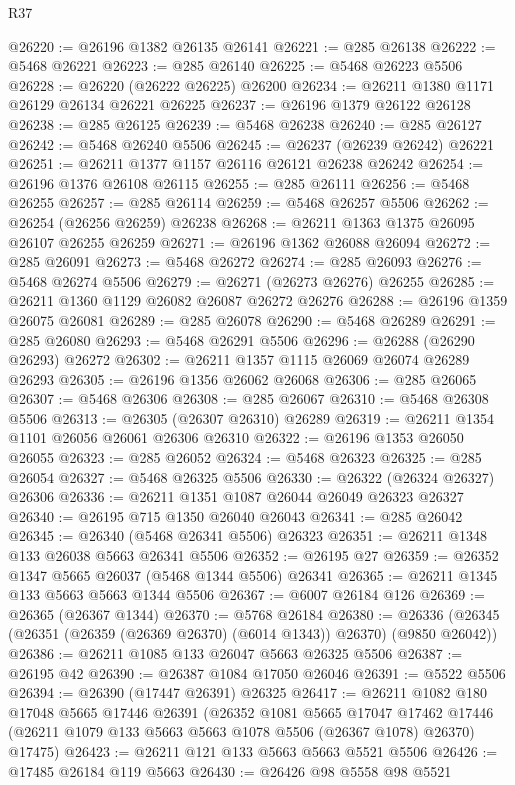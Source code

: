 \begin{lexlean}{R37}
\begin{coremodule}
@26220 := @26196 @1382 @26135 @26141
@26221 := @285 @26138
@26222 := @5468 @26221
@26223 := @285 @26140
@26225 := @5468 @26223 @5506
@26228 := @26220 (@26222 @26225) @26200
@26234 := @26211 @1380 @1171 @26129 @26134 @26221 @26225
@26237 := @26196 @1379 @26122 @26128
@26238 := @285 @26125
@26239 := @5468 @26238
@26240 := @285 @26127
@26242 := @5468 @26240 @5506
@26245 := @26237 (@26239 @26242) @26221
@26251 := @26211 @1377 @1157 @26116 @26121 @26238 @26242
@26254 := @26196 @1376 @26108 @26115
@26255 := @285 @26111
@26256 := @5468 @26255
@26257 := @285 @26114
@26259 := @5468 @26257 @5506
@26262 := @26254 (@26256 @26259) @26238
@26268 := @26211 @1363 @1375 @26095 @26107 @26255 @26259
@26271 := @26196 @1362 @26088 @26094
@26272 := @285 @26091
@26273 := @5468 @26272
@26274 := @285 @26093
@26276 := @5468 @26274 @5506
@26279 := @26271 (@26273 @26276) @26255
@26285 := @26211 @1360 @1129 @26082 @26087 @26272 @26276
@26288 := @26196 @1359 @26075 @26081
@26289 := @285 @26078
@26290 := @5468 @26289
@26291 := @285 @26080
@26293 := @5468 @26291 @5506
@26296 := @26288 (@26290 @26293) @26272
@26302 := @26211 @1357 @1115 @26069 @26074 @26289 @26293
@26305 := @26196 @1356 @26062 @26068
@26306 := @285 @26065
@26307 := @5468 @26306
@26308 := @285 @26067
@26310 := @5468 @26308 @5506
@26313 := @26305 (@26307 @26310) @26289
@26319 := @26211 @1354 @1101 @26056 @26061 @26306 @26310
@26322 := @26196 @1353 @26050 @26055
@26323 := @285 @26052
@26324 := @5468 @26323
@26325 := @285 @26054
@26327 := @5468 @26325 @5506
@26330 := @26322 (@26324 @26327) @26306
@26336 := @26211 @1351 @1087 @26044 @26049 @26323 @26327
@26340 := @26195 @715 @1350 @26040 @26043
@26341 := @285 @26042
@26345 := @26340 (@5468 @26341 @5506) @26323
@26351 := @26211 @1348 @133 @26038 @5663 @26341 @5506
@26352 := @26195 @27
@26359 := @26352 @1347 @5665 @26037 (@5468 @1344 @5506) @26341
@26365 := @26211 @1345 @133 @5663 @5663 @1344 @5506
@26367 := @6007 @26184 @126
@26369 := @26365 (@26367 @1344)
@26370 := @5768 @26184
@26380 := @26336 (@26345 (@26351 (@26359 (@26369 @26370) (@6014 @1343)) @26370) (@9850 @26042))
@26386 := @26211 @1085 @133 @26047 @5663 @26325 @5506
@26387 := @26195 @42
@26390 := @26387 @1084 @17050 @26046
@26391 := @5522 @5506
@26394 := @26390 (@17447 @26391) @26325
@26417 := @26211
    @1082
    @180
    @17048
    @5665
    @17446
    @26391
    (@26352
      @1081
      @5665
      @17047
      @17462
      @17446
      (@26211 @1079 @133 @5663 @5663 @1078 @5506 (@26367 @1078) @26370)
      @17475)
@26423 := @26211 @121 @133 @5663 @5663 @5521 @5506
@26426 := @17485 @26184 @119 @5663
@26430 := @26426 @98 @5558 @98 @5521

\end{coremodule}
\end{lexlean}
